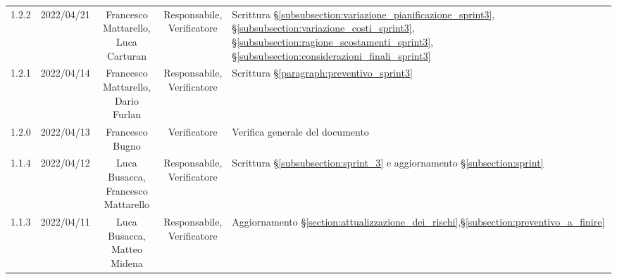 \begin{center}
\begin{longtable}[c]{c | c | c | c | p{5cm}}
		1.2.2                                                      & 2022/04/21 & \Shortunderstack{Francesco Mattarello,                                                                                                                                                              \\Luca Carturan} & \Shortunderstack{Responsabile,\\Verificatore} & Scrittura §\ref{subsubsection:variazione_pianificazione_sprint3}, §\ref{subsubsection:variazione_costi_sprint3}, §\ref{subsubsection:ragione_scostamenti_sprint3}, §\ref{subsubsection:considerazioni_finali_sprint3}\\
		1.2.1                                                      & 2022/04/14 & \Shortunderstack{Francesco Mattarello,                                                                                                                                                              \\Dario Furlan} & \Shortunderstack{Responsabile,\\Verificatore} & Scrittura §\ref{paragraph:preventivo_sprint3}\\
		1.2.0                                                      & 2022/04/13 & Francesco Bugno                        & Verificatore   & Verifica generale del documento                                                                                                           \\
		1.1.4                                                      & 2022/04/12 & \Shortunderstack{Luca Busacca,                                                                                                                                                                      \\Francesco Mattarello} & \Shortunderstack{Responsabile,\\Verificatore} & Scrittura §\ref{subsubsection:sprint_3} e aggiornamento §\ref{subsection:sprint}\\
		1.1.3                                                      & 2022/04/11 & \Shortunderstack{Luca Busacca,                                                                                                                                                                      \\Matteo Midena} & \Shortunderstack{Responsabile,\\Verificatore} & Aggiornamento §\ref{section:attualizzazione_dei_rischi},§\ref{subsection:preventivo_a_finire}\\

\end{longtable}
\end{center}
